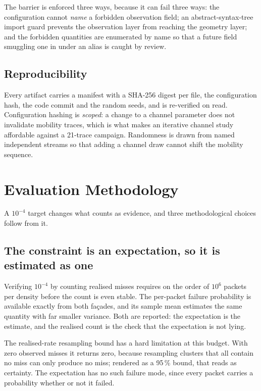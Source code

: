 \documentclass[conference]{IEEEtran}
\begin{document}
The barrier is enforced three ways, because it can fail three ways: the
configuration cannot \emph{name} a forbidden observation field; an
abstract-syntax-tree import guard prevents the observation layer from reaching
the geometry layer; and the forbidden quantities are enumerated by name so
that a future field smuggling one in under an alias is caught by review.

\subsection{Reproducibility}

Every artifact carries a manifest with a SHA-256 digest per file, the
configuration hash, the code commit and the random seeds, and is re-verified
on read. Configuration hashing is \emph{scoped}: a change to a channel
parameter does not invalidate mobility traces, which is what makes an
iterative channel study affordable against a 21-trace campaign. Randomness is
drawn from named independent streams so that adding a channel draw cannot
shift the mobility sequence.

\section{Evaluation Methodology}
\label{sec:method}

A $10^{-4}$ target changes what counts as evidence, and three methodological
choices follow from it.

\subsection{The constraint is an expectation, so it is estimated as one}

Verifying $10^{-4}$ by counting realised misses requires on the order of
$10^{6}$ packets per density before the count is even stable. The per-packet
failure probability is available exactly from both fa\c{c}ades, and its sample
mean estimates the same quantity with far smaller variance. Both are reported:
the expectation is the estimate, and the realised count is the check that the
expectation is not lying.

The realised-rate resampling bound has a hard limitation at this budget. With
zero observed misses it returns zero, because resampling clusters that all
contain no miss can only produce no miss; rendered as a 95\,\% bound, that
reads as certainty. The expectation has no such failure mode, since every
packet carries a probability whether or not it failed.
\end{document}
